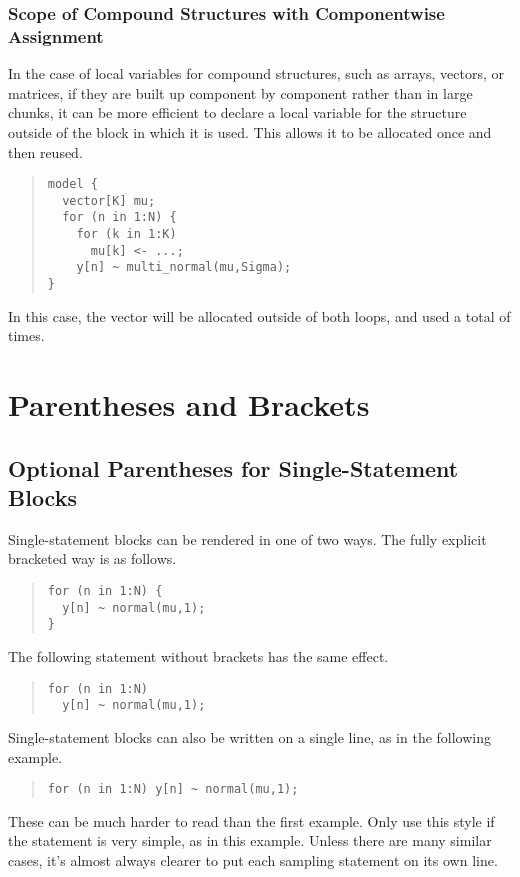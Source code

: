 \subsubsection{Scope of Compound Structures with Componentwise Assignment}

In the case of local variables for compound structures, such as
arrays, vectors, or matrices, if they are built up component by
component rather than in large chunks, it can be more efficient to
declare a local variable for the structure outside of the block
in which it is used.  This allows it to be allocated once and then
reused.
%
\begin{quote}
\begin{Verbatim}[fontsize=\small]
model {
  vector[K] mu;
  for (n in 1:N) {
    for (k in 1:K) 
      mu[k] <- ...;
    y[n] ~ multi_normal(mu,Sigma);
}
\end{Verbatim}
\end{quote}
%
In this case, the vector  will be allocated
outside of both loops, and used a total of  times.

\section{Parentheses and Brackets}

\subsection{Optional Parentheses for Single-Statement Blocks}

Single-statement blocks can be rendered in one of two ways.  The fully
explicit bracketed way is as follows.
%
\begin{quote}
\begin{Verbatim}[fontsize=\small]
for (n in 1:N) {
  y[n] ~ normal(mu,1);
}
\end{Verbatim}
\end{quote}
%
The following statement without brackets has the same effect.
%
\begin{quote}
\begin{Verbatim}  
for (n in 1:N)
  y[n] ~ normal(mu,1);
\end{Verbatim}
\end{quote}
%  
Single-statement blocks can also be written on a single line, as
in the following example.
%
\begin{quote}
\begin{Verbatim} 
for (n in 1:N) y[n] ~ normal(mu,1);
\end{Verbatim}
\end{quote}
%
These can be much harder to read than the first example. Only use this
style if the statement is very simple, as in this example.  Unless
there are many similar cases, it's almost always clearer to put
each sampling statement on its own line.

